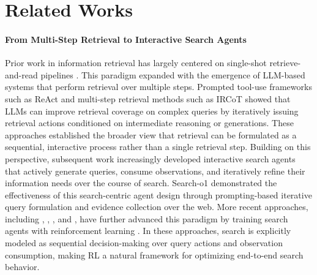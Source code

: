 \section{Related Works}

\paragraph{From Multi-Step Retrieval to Interactive Search Agents}
Prior work in information retrieval has largely centered on single-shot retrieve-and-read pipelines \citep{lee-etal-2019-latent, guu2020retrieval, karpukhin-etal-2020-dense}. This paradigm expanded with the emergence of LLM-based systems that perform retrieval over multiple steps. Prompted tool-use frameworks such as ReAct \citep{react} and multi-step retrieval methods such as IRCoT \citep{ircot} showed that LLMs can improve retrieval coverage on complex queries by iteratively issuing retrieval actions conditioned on intermediate reasoning or generations. These approaches established the broader view that retrieval can be formulated as a sequential, interactive process rather than a single retrieval step.
Building on this perspective, subsequent work increasingly developed interactive search agents that actively generate queries, consume observations, and iteratively refine their information needs over the course of search. Search-o1 \citep{search-o1} demonstrated the effectiveness of this search-centric agent design through prompting-based iterative query formulation and evidence collection over the web. More recent approaches, including \citet{search-r1}, \citet{r1-searcher}, \citet{deepresearcher}, and \citet{ReSearch}, have further advanced this paradigm by training search agents with reinforcement learning \citep{ppo, grpo}. In these approaches, search is explicitly modeled as sequential decision-making over query actions and observation consumption, making RL a natural framework for optimizing end-to-end search behavior.

